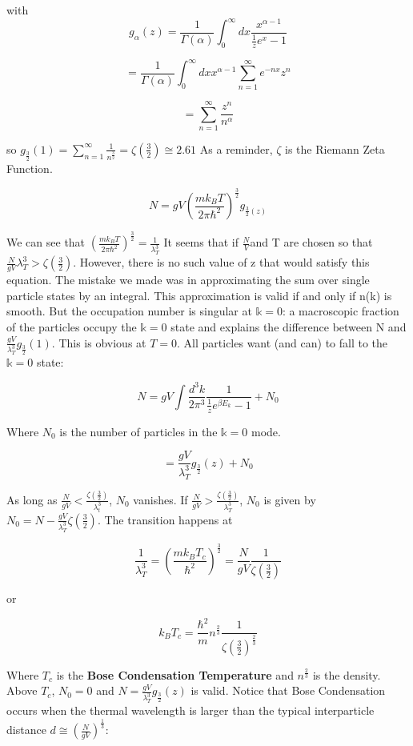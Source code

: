 \documentclass{article}
\newcommand{\bltz}{k_{B}}
\newcommand{\sumser}[2]{\sum\limits_{#1}^{#2}}
\newcommand{\dtk}{\frac{d^{3}k}{2\pi^{3}}}
\begin{document}
with $$g_{\alpha}(z)=\frac{1}{\Gamma(\alpha)}\int_{0}^{\infty}dx\frac{x^{\alpha-1}}{\frac{1}{z}e^{x}-1}$$

$$=\frac{1}{\Gamma(\alpha)}\int_{0}^{\infty}dxx^{\alpha-1}\sumser{n=1}{\infty}e^{-nx}z^{n}$$

$$=\sumser{n=1}{\infty}\frac{z^{n}}{n^{\alpha}}$$

so $g_{\frac{3}{2}}(1)=\sumser{n=1}{\infty}\frac{1}{n^{\frac{3}{2}}}=\zeta(\frac{3}{2})\cong2.61$  As a reminder, $\zeta$ is the Riemann Zeta Function.  


$$N=gV(\frac{m\bltz T}{2\pi\hbar^{2}})^{\frac{3}{2}}g_{\frac{3}{2}(z)}$$

We can see that $(\frac{m\bltz T}{2\pi\hbar^{2}})^{\frac{3}{2}}=\frac{1}{\lambda_{T}^{3}}$  It seems that if $\frac{N}{V}$and T are chosen so that $\frac{N}{gV}\lambda_{T}^{3}>\zeta(\frac{3}{2})$.  However, there is no such value of z that would satisfy this equation.  The mistake we made was in approximating the sum over single particle states by an integral.  This approximation is valid if and only if n(k) is smooth.  But the occupation number is singular at $\mathbb{k}=0$: a macroscopic fraction of the particles occupy the $\mathbb{k}=0$ state and explains the difference between N and $\frac{gV}{\lambda_{T}^{3}}g_{\frac{3}{2}}(1).$  This is obvious at $T=0$.  All particles want (and can) to fall to the $\mathbb{k}=0$ state:
	
$$N=gV\int\dtk\frac{1}{\frac{1}{z}e^{\beta E_{k}}-1}+N_{0}$$

Where $N_{0}$ is the number of particles in the $\mathbb{k}=0$ mode. 

$$=\frac{gV}{\lambda_{T}^{3}}g_{\frac{3}{2}}(z)+N_{0}$$

As long as $\frac{N}{gV}<\frac{\zeta(\frac{3}{2})}{\lambda_{t}^{3}}$, $N_{0}$ vanishes.  If $\frac{N}{gV}>\frac{\zeta(\frac{3}{2})}{\lambda_{T}^{3}}$, $N_{0}$ is given by $N_{0}=N-\frac{gV}{\lambda_{T}^{3}}\zeta(\frac{3}{2})$.  The transition happens at 

$$\frac{1}{\lambda_{T}^{3}}=(\frac{m\bltz T_{c}}{\hbar^{2}})^{\frac{3}{2}}=\frac{N}{gV}\frac{1}{\zeta(\frac{3}{2})}$$

or

$$\bltz T_{c}=\frac{\hbar^{2}}{m}n^{\frac{2}{3}}\frac{1}{\zeta(\frac{3}{2})^{\frac{2}{3}}}$$
	
Where $T_{c}$ is the \textbf{Bose Condensation Temperature} and $n^{\frac{2}{3}}$ is the density.  Above $T_{c}$, $N_{0}=0$ and $N=\frac{gV}{\lambda_{T}^{3}}g_{\frac{3}{2}}(z)$ is valid.  Notice that Bose Condensation occurs when the thermal wavelength is larger than the typical interparticle distance $d\cong(\frac{N}{gV})^{\frac{1}{3}}$:
\end{document}
